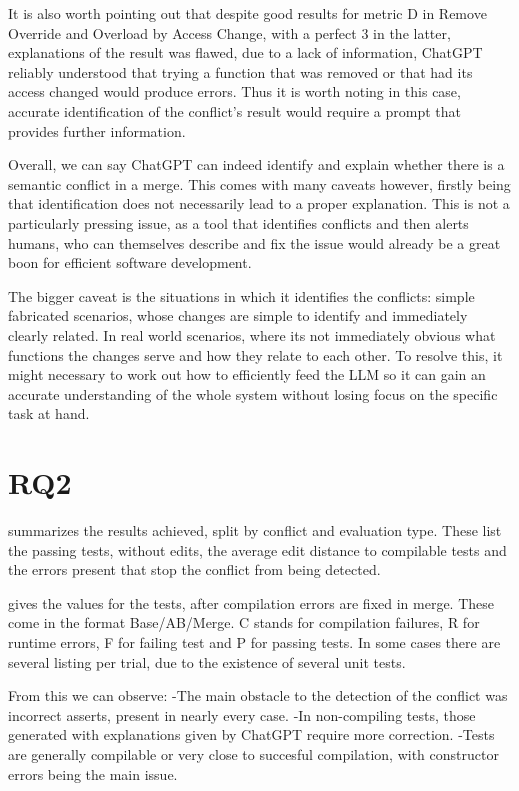 It is also worth pointing out that despite good results for metric D in Remove Override and Overload by Access Change, with a perfect 3 in the latter, explanations of the result was flawed, due to a lack of information, ChatGPT reliably understood that trying a function that was removed or that had its access changed would produce errors. Thus it is worth noting in this case, accurate identification of the conflict's result would require a prompt that provides further information.

Overall, we can say ChatGPT can indeed identify and explain whether there is a semantic conflict in a merge. This comes with many caveats however, firstly being that identification does not necessarily lead to a proper explanation. This is not a particularly pressing issue, as a tool that identifies conflicts and then alerts humans, who can themselves describe and fix the issue would already be a great boon for efficient software development.

The bigger caveat is the situations in which it identifies the conflicts: simple fabricated scenarios, whose changes are simple to identify and immediately clearly related. In real world scenarios, where its not immediately obvious what functions the changes serve and how they relate to each other. To resolve this, it might necessary to work out how to efficiently feed the LLM so it can gain an accurate understanding of the whole system without losing focus on the specific task at hand.

\section{RQ2}\label{sec:results:rq2}

 summarizes the results achieved, split by conflict and evaluation type.
These list the passing tests, without edits, the average edit distance to compilable tests and the errors present that stop the conflict from being detected.

 gives the values for the tests, after compilation errors are fixed in merge.
These come in the format Base/AB/Merge. C stands for compilation failures, R for runtime errors, F for failing test and P for passing tests.
In some cases there are several listing per trial, due to the existence of several unit tests.

From this we can observe:
-The main obstacle to the detection of the conflict was incorrect asserts, present in nearly every case.
-In non-compiling tests, those generated with explanations given by ChatGPT require more correction.
-Tests are generally compilable or very close to succesful compilation, with constructor errors being the main issue.


